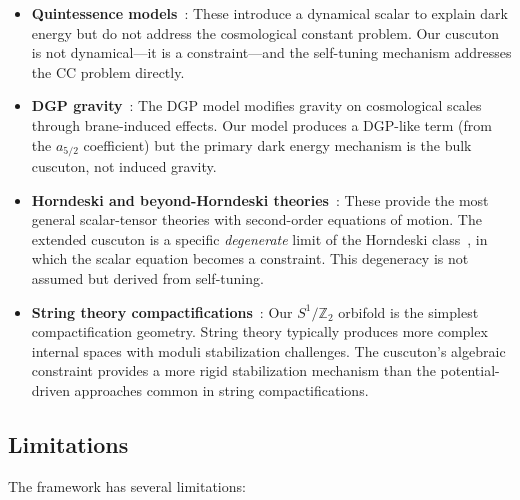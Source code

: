 \begin{itemize}
\item \textbf{Quintessence models}~\cite{ch1:ratra88,ch1:copeland06}: These introduce a dynamical scalar to explain dark energy but do not address the cosmological constant problem. Our cuscuton is not dynamical---it is a constraint---and the self-tuning mechanism addresses the CC problem directly.

\item \textbf{DGP gravity}~\cite{ch1:dgp}: The DGP model modifies gravity on cosmological scales through brane-induced effects. Our model produces a DGP-like term (from the $a_{5/2}$ coefficient) but the primary dark energy mechanism is the bulk cuscuton, not induced gravity.

\item \textbf{Horndeski and beyond-Horndeski theories}~\cite{ch1:horndeski74,ch1:defelice-tsujikawa}: These provide the most general scalar-tensor theories with second-order equations of motion. The extended cuscuton is a specific \emph{degenerate} limit of the Horndeski class~\cite{ch1:iyonaga18}, in which the scalar equation becomes a constraint. This degeneracy is not assumed but derived from self-tuning.

\item \textbf{String theory compactifications}~\cite{ch1:giddings02,ch1:kachru03}: Our $S^1/\mathbb{Z}_2$ orbifold is the simplest compactification geometry. String theory typically produces more complex internal spaces with moduli stabilization challenges. The cuscuton's algebraic constraint provides a more rigid stabilization mechanism than the potential-driven approaches common in string compactifications.
\end{itemize}

\subsection{Limitations}
\label{sec:1-limitations}

The framework has several limitations:

